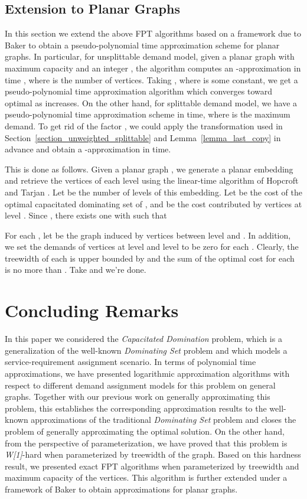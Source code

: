 \documentclass[a4paper,11pt]{article}
\theoremstyle{definition}
\begin{document}
\subsection{Extension to Planar Graphs}

In this section we extend the above FPT algorithms based on a framework due to Baker \cite{174650} to obtain a pseudo-polynomial time approximation scheme for planar graphs. In particular, for unsplittable demand model, given a planar graph  with maximum capacity  and an integer , the algorithm computes an -approximation in time , where  is the number of vertices. Taking , where  is some constant, we get a pseudo-polynomial time approximation algorithm which converges toward optimal as  increases. On the other hand, for splittable demand model, we have a pseudo-polynomial time approximation scheme in  time, where  is the maximum demand. To get rid of the factor , we could apply the transformation used in Section~\ref{section_unweighted_splittable} and Lemma~\ref{lemma_last_copy} in advance and obtain a -approximation in  time.

\smallskip

This is done as follows. Given a planar graph , we generate a planar embedding and retrieve the vertices of each level using the linear-time algorithm of Hopcroft and Tarjan \cite{321852}. Let  be the number of levels of this embedding. Let  be the cost of the optimal capacitated dominating set of , and  be the cost contributed by vertices at level . Since , there exists one  with  such that 

For each , let  be the graph induced by vertices between level  and . In addition, we set the demands of vertices at level  and level  to be zero for each . Clearly, the treewidth of each  is upper bounded by  and the sum of the optimal cost for each  is no more than . Take  and we're done.



\section{Concluding Remarks} \label{conclusion}

In this paper we considered the {\em Capacitated Domination} problem, which is a generalization of the well-known {\em Dominating Set} problem and which models a service-requirement assignment scenario. In terms of polynomial time approximations, we have presented logarithmic approximation algorithms with respect to different demand assignment models for this problem on general graphs. Together with our previous
work on generally approximating this problem, this establishes the corresponding approximation results to the well-known approximations of the traditional {\em Dominating Set} problem and closes the problem of generally approximating the optimal solution. On the other hand, from the perspective of parameterization, we have proved that this problem is {\it W[1]}-hard when parameterized by treewidth of the graph. Based on this hardness result, we presented exact FPT algorithms when parameterized by treewidth and maximum capacity of the vertices. This algorithm is further extended under a framework of Baker \cite{174650} to obtain approximations for planar graphs.
\end{document}
